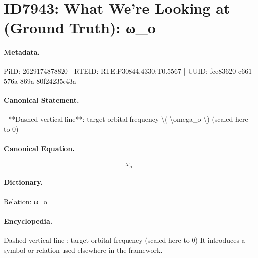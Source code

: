 \section*{ID7943: What We’re Looking at (Ground Truth): ω\_o}
\paragraph{Metadata.}
PiID: 2629174878820 | RTEID: RTE:P30844.4330:T0.5567 | UUID: fce83620-c661-576a-869a-80f24235c43a

\paragraph{Canonical Statement.}
- **Dashed vertical line**: target orbital frequency \textbackslash{}( \textbackslash{}omega\_o \textbackslash{}) (scaled here to 0)

\paragraph{Canonical Equation.}
\[
\omega_o
\]

\paragraph{Dictionary.}
Relation: ω\_o

\paragraph{Encyclopedia.}
Dashed vertical line : target orbital frequency (scaled here to 0) It introduces a symbol or relation used elsewhere in the framework.
